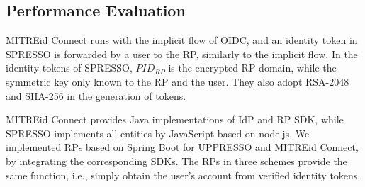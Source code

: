 \subsection{Performance Evaluation}
\label{sec:evaluation}




MITREid Connect runs with the implicit flow of OIDC,
 and an identity token in SPRESSO is forwarded by a user to the RP,
    similarly to the implicit flow. %
In the identity tokens of SPRESSO, $PID_{RP}$ is the encrypted RP domain, while the symmetric key only known to the RP and the user.
They also adopt RSA-2048 and SHA-256  in the generation of tokens.


MITREid Connect provides Java implementations of IdP and
RP SDK,
 while SPRESSO implements all entities by JavaScript based on node.js.
We implemented RPs based on Spring Boot for UPPRESSO and MITREid Connect, by integrating the corresponding SDKs.
The RPs in three schemes provide the same function, i.e.,
     simply obtain the user's account from verified identity tokens.

